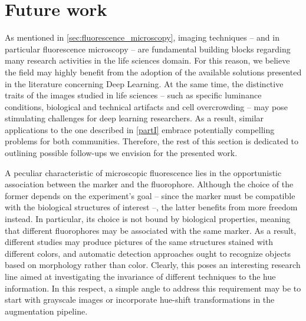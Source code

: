 \section{Future work}

As mentioned in \cref{sec:fluorescence_microscopy}, imaging techniques -- and in particular fluorescence microscopy -- are fundamental building blocks regarding many research activities in the life sciences domain.
For this reason, we believe the field may highly benefit from the adoption of the available solutions presented in the literature concerning Deep Learning.
At the same time, the distinctive traits of the images studied in life sciences -- such as specific luminance conditions, biological and technical artifacts and cell overcrowding -- may pose stimulating challenges for deep learning researchers.
As a result, similar applications to the one described in \cref{partI} embrace potentially compelling problems for both communities. Therefore, the rest of this section is dedicated to outlining possible follow-ups we envision for the presented work.

A peculiar characteristic of microscopic fluorescence lies in the opportunistic association between the marker and the fluorophore.
Although the choice of the former depends on the experiment's goal -- since the marker must be compatible with the biological structures of interest --, the latter benefits from more freedom instead.
In particular, its choice is not bound by biological properties, meaning that different fluorophores may be associated with the same marker.
As a result, different studies may produce pictures of the same structures stained with different colors, and automatic detection approaches ought to recognize objects based on morphology rather than color.
Clearly, this poses an interesting research line aimed at investigating the invariance of different techniques to the hue information.
In this respect, a simple angle to address this requirement may be to start with grayscale images or incorporate hue-shift transformations in the augmentation pipeline.

